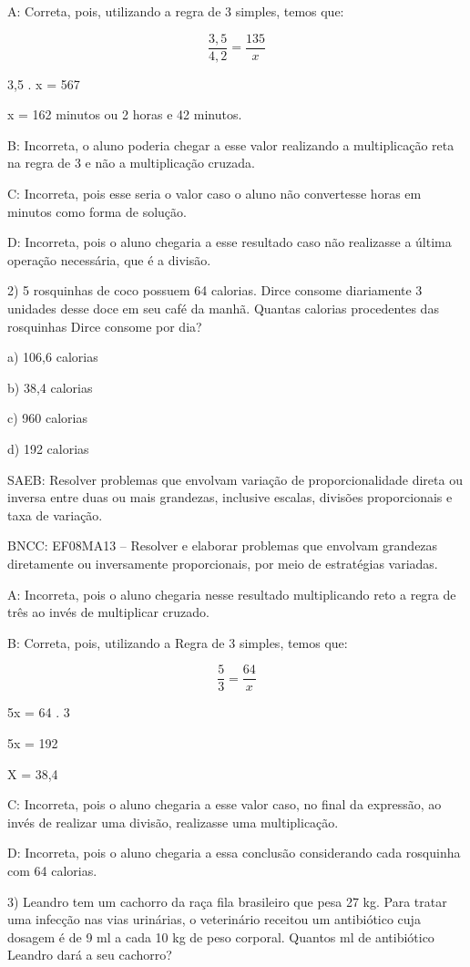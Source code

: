 A: Correta, pois, utilizando a regra de 3 simples, temos que:

\[\frac {3,5}{4,2} = \frac{135}{x}\]

3,5 . x = 567

x = 162 minutos ou 2 horas e 42 minutos.

B: Incorreta, o aluno poderia chegar a esse valor realizando a
multiplicação reta na regra de 3 e não a multiplicação cruzada.

C: Incorreta, pois esse seria o valor caso o aluno não convertesse horas
em minutos como forma de solução.

D: Incorreta, pois o aluno chegaria a esse resultado caso não realizasse
a última operação necessária, que é a divisão.

2) 5 rosquinhas de coco possuem 64 calorias. Dirce consome diariamente 3
unidades desse doce em seu café da manhã. Quantas calorias procedentes
das rosquinhas Dirce consome por dia?

a) 106,6 calorias

b) 38,4 calorias

c) 960 calorias

d) 192 calorias

SAEB: Resolver problemas que envolvam variação de proporcionalidade
direta ou inversa entre duas ou mais grandezas, inclusive escalas,
divisões proporcionais e taxa de variação.

BNCC: EF08MA13 -- Resolver e elaborar problemas que envolvam grandezas
diretamente ou inversamente proporcionais, por meio de estratégias
variadas.

A: Incorreta, pois o aluno chegaria nesse resultado multiplicando reto a
regra de três ao invés de multiplicar cruzado.

B: Correta, pois, utilizando a Regra de 3 simples, temos que:

\[\frac {5}{3} = \frac{64}{x}\]

5x = 64 . 3

5x = 192

X = 38,4

C: Incorreta, pois o aluno chegaria a esse valor caso, no final da
expressão, ao invés de realizar uma divisão, realizasse uma
multiplicação.

D: Incorreta, pois o aluno chegaria a essa conclusão considerando cada
rosquinha com 64 calorias.

3) Leandro tem um cachorro da raça fila brasileiro que pesa 27 kg. Para
tratar uma infecção nas vias urinárias, o veterinário receitou um
antibiótico cuja dosagem é de 9 ml a cada 10 kg de peso corporal.
Quantos ml de antibiótico Leandro dará a seu cachorro?

